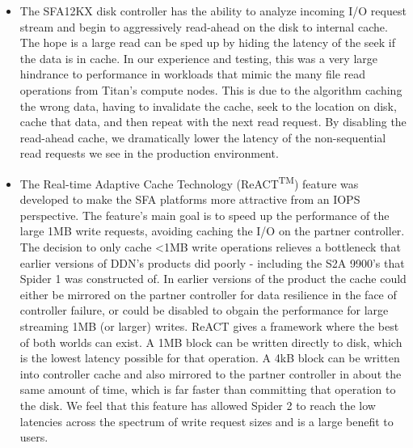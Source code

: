 \begin{itemize}

\item The SFA12KX disk controller has the ability to analyze incoming I/O
request stream and begin to aggressively read-ahead on the disk to internal
cache. The hope is a large read can be sped up by hiding the latency of
the seek if the data is in cache.  In our experience and testing, this was a
very large hindrance to performance in workloads that mimic the many file read
operations from Titan's compute nodes. This is due to the algorithm caching the
wrong data, having to invalidate the cache, seek to the location on disk, cache
that data, and then repeat with the next read request. By disabling the
read-ahead cache, we dramatically lower the latency of the non-sequential read
requests we see in the production environment. 

\item The Real-time Adaptive Cache Technology
(ReACT\textsuperscript{TM}) feature was developed to make the SFA
platforms more attractive from an IOPS perspective. The feature's main goal is
to speed up the performance of the large 1MB write requests, avoiding caching
the I/O on the partner controller. The decision to only cache <1MB write
operations relieves a bottleneck that earlier versions of DDN's products did
poorly - including the S2A 9900's that Spider 1 was constructed of. In earlier
versions of the product the cache could either be mirrored on the partner
controller for data resilience in the face of controller failure, or could
be disabled to obgain the performance for large streaming 1MB (or larger)
writes. ReACT gives a framework where the best of both worlds can exist.  A 1MB
block can be written directly to disk, which is the lowest latency possible for
that operation. A 4kB block can be written into controller cache and also mirrored to
the partner controller in about the same amount of time, which is far faster
than committing that operation to the disk. We feel that this feature has
allowed Spider 2 to reach the low latencies across the spectrum of write
request sizes and is a large benefit to users. 

\end{itemize}


  

